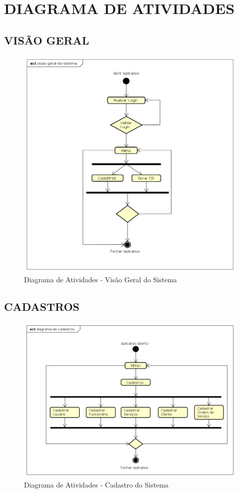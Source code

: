 \section{DIAGRAMA DE ATIVIDADES}
\subsection{VISÃO GERAL}
\begin{figure}[htb]
	\caption{\label{fig_visao-geral} Diagrama de Atividades - Visão Geral do Sistema}
	\begin{center}
	    \includegraphics[width=0.7\linewidth]{imagens/diagrama-atividade-visao-geral.png}
	\end{center}
\end{figure}

\newpage

\subsection{CADASTROS}
\begin{figure}[htb]
	\caption{\label{fig_cadastro} Diagrama de Atividades - Cadastro do Sistema}
	\begin{center}
	    \includegraphics[width=0.9\linewidth]{imagens/diagrama-de-cadastros.png}
	\end{center}
\end{figure}

